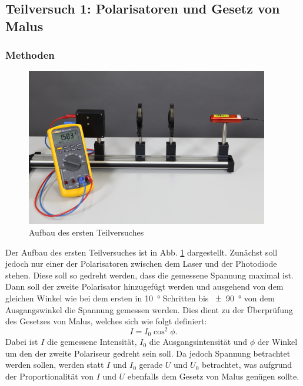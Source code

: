 \subsection{Teilversuch 1: Polarisatoren und Gesetz von Malus}
	
		\subsubsection*{Methoden}
			
			\begin{figure}[ht]
				\centering
				\includegraphics[width=\textwidth]{bilder/Polarisation.png}
				\caption{Aufbau des ersten Teilversuches\cite{WWU}}
				\label{fig:Polarisation}	
			\end{figure}
			Der Aufbau des ersten Teilversuches ist in Abb. \ref{fig:Polarisation} dargestellt.
			Zunächst soll jedoch nur einer der Polarisatoren zwischen dem Laser und der Photodiode stehen.
			Diese soll so gedreht werden, dass die gemessene Spannung maximal ist.
			Dann soll der zweite Polarisator hinzugefügt werden und ausgehend von dem gleichen Winkel wie bei dem ersten in \SI{10}{\degree} Schritten bis \SI{+-90}{\degree} von dem Ausgangswinkel die Spannung gemessen werden.
			Dies dient zu der Überprüfung des Gesetzes von Malus, welches sich wie folgt definiert:
			\begin{equation}
				I = I_0 \cos^2{\phi}.
			\end{equation}
			Dabei ist $I$ die gemessene Intensität, $I_0$ die Ausgangsintensität und $\phi$ der Winkel um den der zweite Polariseur gedreht sein soll.
			Da jedoch Spannung betrachtet werden sollen, werden statt $I$ und $I_0$ gerade $U$ und $U_0$ betrachtet, was aufgrund der Proportionalität von $I$ und $U$ ebenfalls dem Gesetz von Malus genügen sollte.
			
